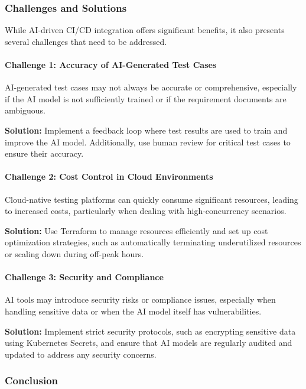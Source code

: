 \documentclass[manuscript,screen,review]{acmart}
\begin{document}
\subsubsection{Challenges and Solutions}


While AI-driven CI/CD integration offers significant benefits, it also presents several challenges that need to be addressed.

\paragraph{Challenge 1: Accuracy of AI-Generated Test Cases}

AI-generated test cases may not always be accurate or comprehensive, especially if the AI model is not sufficiently trained or if the requirement documents are ambiguous.

\textbf{Solution:} Implement a feedback loop where test results are used to train and improve the AI model. Additionally, use human review for critical test cases to ensure their accuracy.

\paragraph{Challenge 2: Cost Control in Cloud Environments}

Cloud-native testing platforms can quickly consume significant resources, leading to increased costs, particularly when dealing with high-concurrency scenarios.

\textbf{Solution:} Use Terraform to manage resources efficiently and set up cost optimization strategies, such as automatically terminating underutilized resources or scaling down during off-peak hours.

\paragraph{Challenge 3: Security and Compliance}

AI tools may introduce security risks or compliance issues, especially when handling sensitive data or when the AI model itself has vulnerabilities.

\textbf{Solution:} Implement strict security protocols, such as encrypting sensitive data using Kubernetes Secrets, and ensure that AI models are regularly audited and updated to address any security concerns.

\subsubsection{Conclusion}
\end{document}
